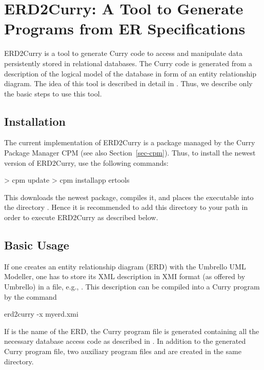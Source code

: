 \section{ERD2Curry: A Tool to Generate Programs from ER Specifications}
\label{sec-erd2curry}

ERD2Curry
is a tool to generate Curry code to access and manipulate data
persistently stored in relational databases.
The Curry code is generated from a description of the logical model
of the database in form of an
entity relationship diagram.
The idea of this tool is described in detail in
\cite{BrasselHanusMueller08PADL}.
Thus, we describe only the basic steps to use this tool.

\subsection{Installation}

The current implementation of ERD2Curry is a package
managed by the Curry Package Manager CPM
(see also Section~\ref{sec-cpm}).
Thus, to install the newest version of ERD2Curry, use the following commands:
%
\begin{curry}
> cpm update
> cpm installapp ertools
\end{curry}
%
This downloads the newest package, compiles it, and places
the executable  into the directory .
Hence it is recommended to add this directory to your path
in order to execute ERD2Curry as described below.

\subsection{Basic Usage}

If one creates an entity relationship diagram (ERD)
with the Umbrello UML Modeller, one has to store its
XML description in XMI format (as offered by Umbrello)
in a file, e.g., .
This description can be compiled into a Curry program by the
command
\begin{curry}
erd2curry -x myerd.xmi
\end{curry}
If  is the name of the ERD, the Curry program file
 is generated containing all the necessary
database access code as described in \cite{BrasselHanusMueller08PADL}.
In addition to the generated Curry program file,
two auxiliary program files
 and 
are created in the same directory.

